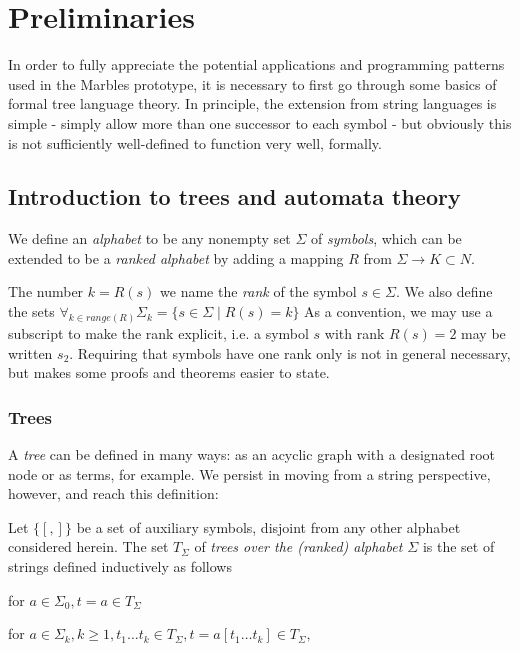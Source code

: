 \section{Preliminaries}

In order to fully appreciate the potential applications and programming
patterns used in the Marbles prototype, it is necessary to first go through
some basics of formal tree language theory. In principle, the extension
from string languages is simple - simply allow more than one successor to
each symbol - but obviously this is not sufficiently well-defined to
function very well, formally.

\subsection{Introduction to trees and automata theory}

We define an \emph{alphabet} to be any nonempty set $\Sigma$ of
\emph{symbols}, which can be extended to be a \emph{ranked alphabet}
by adding a mapping $R$ from $\Sigma \rightarrow K \subset N$.

The number $k = R(s)$ we name the \emph{rank} of the symbol $s \in \Sigma$.
We also define the sets $ \forall_{k \in \mathit{range}(R)} \Sigma_k = \{s \in \Sigma \mid R(s) = k\}$
As a convention, we may use a subscript to make the rank explicit, i.e. a
symbol $s$ with rank $R(s) = 2$ may be written $s_2$. Requiring that
symbols have one rank only is not in general necessary, but makes some
proofs and theorems easier to state.

\subsubsection{Trees}

A \emph{tree} can be defined in many ways: as an acyclic graph with a
designated root node or as terms, for example. We persist in moving from a
string perspective, however, and reach this definition:

Let $\{[, ]\}$ be a set of auxiliary symbols, disjoint from any other alphabet considered herein.
The set $T_\Sigma$ of \emph{trees over the (ranked)
alphabet $\Sigma$} is the set of strings defined inductively as follows
\begin{compactitem}
\item for  $a \in \Sigma_0, t = a \in T_\Sigma$
\item for  $a \in \Sigma_k, k \geq 1, t_1 \ldots t_k \in T_\Sigma,  t = a[t_1
\ldots t_k] \in T_\Sigma,$
\end{compactitem}

